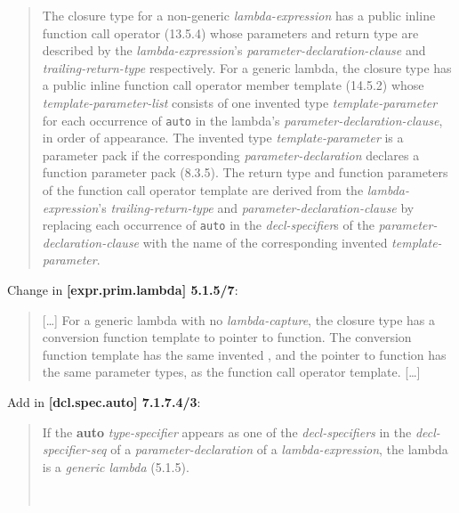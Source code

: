 \documentclass{wg21}
\newcommand{\cc}[1]{\texttt{#1}}
\begin{document}
\begin{quote}
  The closure type for a non-generic \textit{lambda-expression} has a public
  inline function call operator (13.5.4) whose parameters and return type are
  described by the \textit{lambda-expression}'s \textit{parameter-declaration-clause}
  and \textit{trailing-return-type} respectively. For a generic lambda, the
  closure type has a public inline function call operator member template
  (14.5.2) whose \textit{template-parameter-list} consists of 
  one invented type \textit{template-parameter} for each occurrence of \cc{auto}
  in the lambda's \textit{parameter-declaration-clause}, in order of appearance.
  The invented type \textit{template-parameter} is a parameter pack if the
  corresponding \textit{parameter-declaration} declares a function parameter
  pack (8.3.5). The return type and function parameters of the function call
  operator template are derived from the \textit{lambda-expression}'s
  \textit{trailing-return-type} and \textit{parameter-declaration-clause} by
  replacing each occurrence of \cc{auto} in the \textit{decl-specifier}s of
  the \textit{parameter-declaration-clause} with the name of the corresponding
  invented \textit{template-parameter}.
\end{quote}

Change in \textbf{[expr.prim.lambda] 5.1.5/7}:

\begin{quote}
  [\dots] For a generic lambda with no \textit{lambda-capture}, the closure type
  has a conversion function template to pointer to function. The conversion function
  template has the same invented , and the pointer to function has the same parameter types, as
  the function call operator template. [\dots]
\end{quote}

Add in \textbf{[dcl.spec.auto] 7.1.7.4/3}:

\begin{quote}
  If the \textbf{auto} \textit{type-specifier} appears as one of the \textit{decl-specifiers}
  in the \textit{decl-specifier-seq} of a \textit{parameter-declaration} of a
  \textit{lambda-expression}, 
  the lambda is a \textit{generic lambda} (5.1.5).
  \begin{example}\\
  \end{example}
\end{quote}
\end{document}
